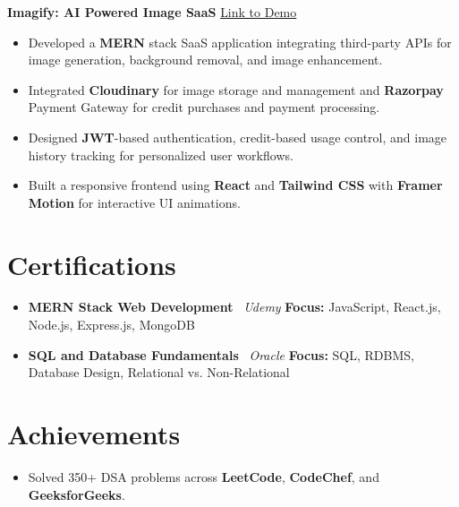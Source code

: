 \documentclass[a4paper,11pt]{article}
\begin{document}
\vspace{2pt}
\noindent\textbf{Imagify: AI Powered Image SaaS}
\hfill \href{https://imagify-five-bice.vercel.app/}{Link to Demo}

\begin{itemize}[leftmargin=1.15em, itemsep=0.5pt, topsep=0.5pt, parsep=0pt, partopsep=0pt]
    \item Developed a \textbf{MERN} stack SaaS application integrating third-party APIs for image generation, background removal, and image enhancement.
    \item Integrated \textbf{Cloudinary} for image storage and management and \textbf{Razorpay} Payment Gateway for credit purchases and payment processing.
    \item Designed \textbf{JWT}-based authentication, credit-based usage control, and image history tracking for personalized user workflows.
    \item Built a responsive frontend using \textbf{React} and \textbf{Tailwind CSS} with \textbf{Framer Motion} for interactive UI animations.
\end{itemize}

\vspace{4pt}
\section{Certifications}

\begin{itemize}[leftmargin=1.15em, itemsep=0.5pt, topsep=0.5pt, parsep=0pt, partopsep=0pt]
	\item \textbf{MERN Stack Web Development} \textendash\ \textit{Udemy} \hfill \textbf{Focus:} JavaScript, React.js, Node.js, Express.js, MongoDB
	\item \textbf{SQL and Database Fundamentals} \textendash\ \textit{Oracle} \hfill \textbf{Focus:} SQL, RDBMS, Database Design, Relational vs. Non-Relational
\end{itemize}

\section{Achievements}

\begin{itemize}[leftmargin=1.15em, itemsep=0pt, topsep=0.5pt, parsep=0pt, partopsep=0pt]
	\item Solved 350+ DSA problems across \textbf{LeetCode}, \textbf{CodeChef}, and \textbf{GeeksforGeeks}.
\end{itemize}
\end{document}
